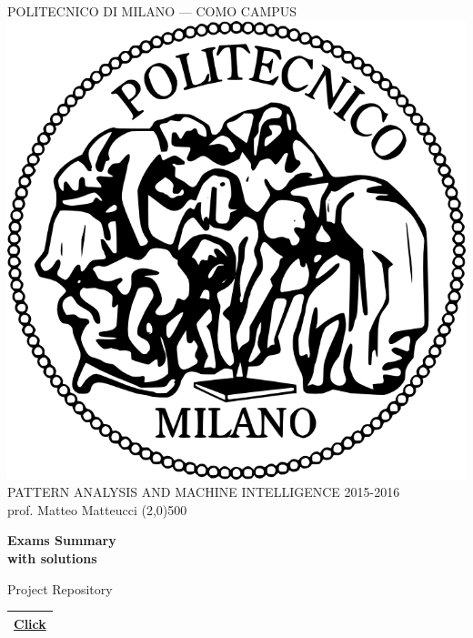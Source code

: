 \documentclass[a4paper,12pt,titlepage]{article} %
\begin{document}
    \begin{titlepage}

        \begin{center}
            POLITECNICO DI MILANO --- COMO CAMPUS\\
            \vspace{10pt}
            \includegraphics[scale=0.1]{logo-polimi.png}\\
            \vspace{10pt}
            PATTERN ANALYSIS AND MACHINE INTELLIGENCE 2015-2016\\
            prof. Matteo Matteucci	
            \line(2,0){500}
        \end{center}

        \vspace{60pt}	
        \begin{center}
            {\Huge \textbf{Exams Summary}}\\
            \vspace{20pt}
            {\large \textbf{with solutions}}\\
        \end{center}
		
       \vspace{60pt}		
        \begin{center}
            {\large Project Repository}
        \end{center}
        \begin{tabularx}{\textwidth}{|X|}
            \hline
            \href{https://github.com/attillax/PAMI-2015}{Click}\\
            \hline
        \end{tabularx}


\end{titlepage}
\end{document}
